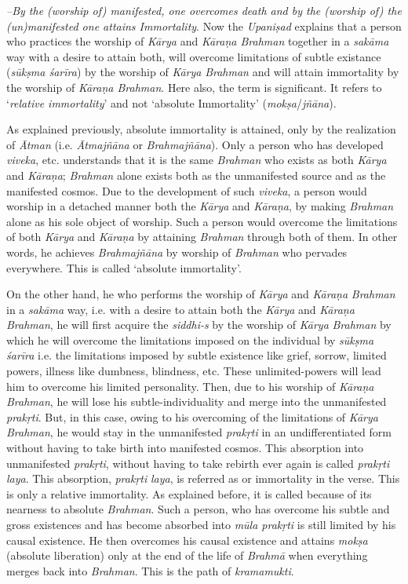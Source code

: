 \emph{--By the (worship of) manifested, one overcomes death and by the (worship of) the (un)manifested one attains Immortality}. Now the \emph{Upaniṣad} explains that a person who practices the worship of \emph{Kārya} and \emph{Kāraṇa Brahman} together in a \emph{sakāma} way with a desire to attain both, will overcome limitations of subtle existance (\emph{sūkṣma śarīra}) by the worship of \emph{Kārya} \emph{Brahman} and will attain immortality by the worship of \emph{Kāraṇa Brahman}. Here also, the term  is significant. It refers to `\emph{relative immortality}' and not `absolute Immortality' (\emph{mokṣa}/\emph{jñāna}).

As explained previously, absolute immortality is attained, only by the realization of \emph{Ātman} (i.e. \emph{Ātmajñāna} or \emph{Brahmajñāna}). Only a person who has developed \emph{viveka}, etc. understands that it is the same \emph{Brahman} who exists as both \emph{Kārya} and \emph{Kāraṇa}; \emph{Brahman} alone exists both as the unmanifested source and as the manifested cosmos. Due to the development of such \emph{viveka}, a person would worship in a detached manner both the \emph{Kārya} and \emph{Kāraṇa}, by making \emph{Brahman} alone as his sole object of worship. Such a person would overcome the limitations of both \emph{Kārya} and \emph{Kāraṇa} by attaining \emph{Brahman} through both of them. In other words, he achieves \emph{Brahmajñāna} by worship of \emph{Brahman} who pervades everywhere. This is called `absolute immortality'.

On the other hand, he who performs the worship of \emph{Kārya} and \emph{Kāraṇa} \emph{Brahman} in a \emph{sakāma} way, i.e. with a desire to attain both the \emph{Kārya} and \emph{Kāraṇa} \emph{Brahman}, he will first acquire the \emph{siddhi-s} by the worship of \emph{Kārya} \emph{Brahman} by which he will overcome the limitations imposed on the individual by \emph{sūkṣma śarīra} i.e. the limitations imposed by subtle existence like grief, sorrow, limited powers, illness like dumbness, blindness, etc. These unlimited-powers will lead him to overcome his limited personality. Then, due to his worship of \emph{Kāraṇa Brahman}, he will lose his subtle-individuality and merge into the unmanifested \emph{prakṛti}. But, in this case, owing to his overcoming of the limitations of \emph{Kārya} \emph{Brahman}, he would stay in the unmanifested \emph{prakṛti} in an undifferentiated form without having to take birth into manifested cosmos. This absorption into unmanifested \emph{prakṛti}, without having to take rebirth ever again is called \emph{prakṛti} \emph{laya}. This absorption, \emph{prakṛti} \emph{laya}, is referred as  or immortality in the verse. This is only a relative immortality. As explained before, it is called  because of its nearness to absolute \emph{Brahman}. Such a person, who has overcome his subtle and gross existences and has become absorbed into \emph{mūla prakṛti} is still limited by his causal existence. He then overcomes his causal existence and attains \emph{mokṣa} (absolute liberation) only at the end of the life of \emph{Brahmā} when everything merges back into \emph{Brahman}. This is the path of \emph{kramamukti}.

